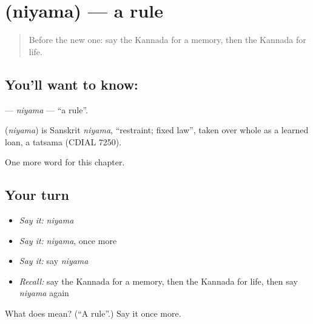 \section[\texorpdfstring{\kn{ನಿಯಮ} (niyama)}{ನಿಯಮ (niyama)}]{ (niyama) — a rule}

\label{lesson:KA-C253-niyama}



\begin{quote}
Before the new one: say the Kannada for a memory, then the Kannada for life.
\end{quote}

\subsection*{You'll want to know: }
\textbf{} — \emph{niyama} — \textquotedblleft{}a rule\textquotedblright{}.

\begin{cousinweb}
\textbf{} (\emph{niyama}) is Sanskrit \emph{niyama}, \textquotedblleft{}restraint; fixed law\textquotedblright{}, taken over whole as a learned loan, a tatsama (CDIAL 7250).
\end{cousinweb}

\begin{grammarlens}[title={What you've built}]
One more word for this chapter.
\end{grammarlens}

\subsection*{Your turn}
\begin{itemize}
\raggedright
  \item \emph{Say it:} \emph{niyama}
  \item \emph{Say it:} \emph{niyama}, once more
  \item \emph{Say it:} say \emph{niyama}
  \item \emph{Recall:} say the Kannada for a memory, then the Kannada for life, then say \emph{niyama} again
\end{itemize}

\begin{tcolorbox}[breakable,colback=teal!4,colframe=teal!35!black,title={Before you move on}]
What does  mean? (\textquotedblleft{}A rule\textquotedblright{}.) Say it once more.
\end{tcolorbox}
